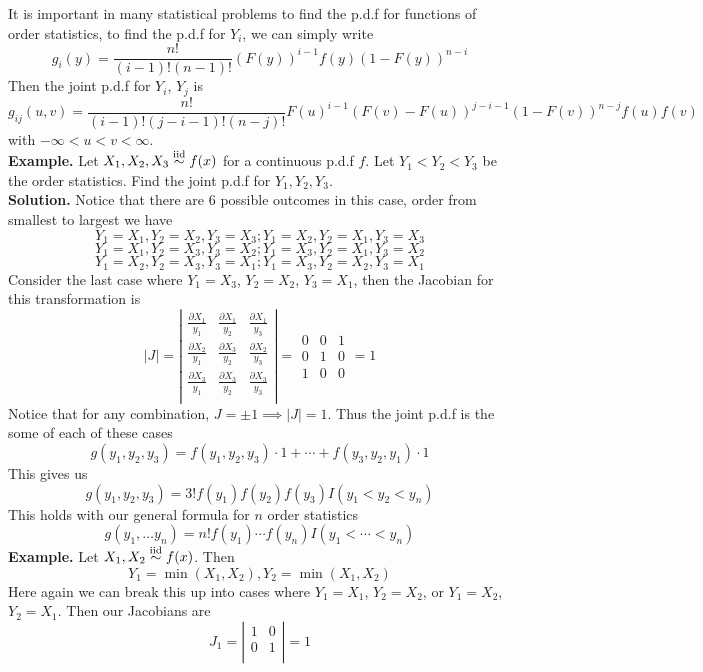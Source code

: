 \documentclass[openany]{report}
\begin{document}
     It is important in many statistical problems to find the p.d.f for functions of order statistics, to find the p.d.f for $Y_i$, we can simply write 
     \[g_i(y) = \frac{n!}{(i-1)!(n-1)!}(F(y ))^{i-1}f(y)(1-F(y))^{n-i}\]
     Then the joint p.d.f for $Y_i$, $Y_j$ is 
     \[g_{ij}(u,v) = \frac{n!}{(i-1)!(j-i-1)!(n-j)!}F(u)^{i-1}(F(v)-F(u))^{j-i-1}(1-F(v))^{n-j}f(u)f(v)\]
     with $-\infty < u < v < \infty$.\\[2ex]
     \textbf{Example.} Let $X_1,X_2,X_3 \overset{\mathrm{iid}}{\sim} f(x)$ for a continuous p.d.f $f$. Let $Y_1 < Y_2 < Y_3$ be the order statistics. Find the joint p.d.f for $Y_1,Y_2,Y_3$.\\[2ex]
     \textbf{Solution.} Notice that there are 6 possible outcomes in this case, order from smallest to largest we have 
     \[Y_1 = X_1, Y_2 = X_2, Y_3 = X_3; Y_1 = X_2, Y_2 = X_1, Y_3 = X_3\]
     \[Y_1 = X_1, Y_2 = X_3, Y_3 = X_2; Y_1 = X_3, Y_2 = X_1, Y_3 = X_2\]
     \[Y_1 = X_2, Y_2 = X_3, Y_3 = X_1; Y_1 = X_3, Y_2 = X_2, Y_3 = X_1\]
     Consider the last case where $Y_1 = X_3$, $Y_2 = X_2$, $Y_3 = X_1$, then the Jacobian for this transformation is 
     \[|J| = \left|\begin{matrix}
        \frac{\partial X_1}{y_1} & \frac{\partial X_1}{y_2} & \frac{\partial X_1}{y_3}\\
        \frac{\partial X_2}{y_1} & \frac{\partial X_3}{y_2} & \frac{\partial X_2}{y_3}\\
        \frac{\partial X_3}{y_1} & \frac{\partial X_3}{y_2} & \frac{\partial X_3}{y_3}\\
     \end{matrix}\right| = \begin{matrix}
        0 & 0 & 1\\
        0 & 1 & 0\\
        1 & 0 & 0
     \end{matrix} = 1 \]
     Notice that for any combination, $J = \pm 1 \implies |J| = 1$. Thus the joint p.d.f is the some of each of these cases 
     \[g(y_1,y_2, y_3) = f(y_1,y_2,y_3)\cdot 1 + \cdots + f(y_3,y_2,y_1)\cdot 1\]
     This gives us 
     \[g(y_1,y_2,y_3) = 3!f(y_1)f(y_2)f(y_3)I(y_1 < y_2 < y_n)\]
     This holds with our general formula for $n$ order statistics
     \[g(y_1,\ldots y_n) = n!f(y_1)\cdots f(y_n)I(y_1 < \cdots < y_n)\]
     \textbf{Example.} Let $X_1,X_2 \overset{\mathrm{iid}}{\sim} f(x)$. Then 
     \[Y_1 = \min(X_1, X_2), Y_2 = \min(X_1, X_2)\]
     Here again we can break this up into cases where $Y_1 = X_1$, $Y_2 = X_2$, or $Y_1 = X_2$, $Y_2 = X_1$. Then our Jacobians are 
     \[J_1 = \left|\begin{matrix}
        1 & 0 \\
        0 & 1\\
     \end{matrix}\right| = 1\]
     
\end{document}
